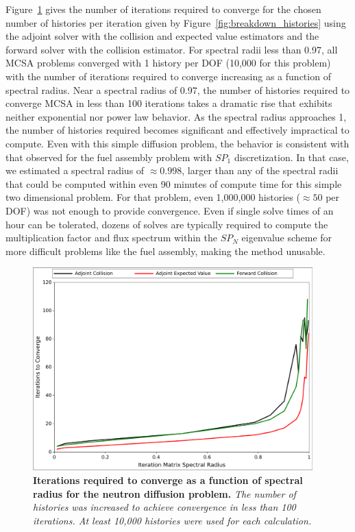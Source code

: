 Figure~\ref{fig:breakdown_iterations} gives the number of iterations
required to converge for the chosen number of histories per iteration
given by Figure~\ref{fig:breakdown_histories} using the adjoint solver
with the collision and expected value estimators and the forward
solver with the collision estimator. For spectral radii less than
0.97, all MCSA problems converged with 1 history per DOF (10,000 for
this problem) with the number of iterations required to converge
increasing as a function of spectral radius. Near a spectral radius of
0.97, the number of histories required to converge MCSA in less than
100 iterations takes a dramatic rise that exhibits neither exponential
nor power law behavior. As the spectral radius approaches 1, the
number of histories required becomes significant and effectively
impractical to compute. Even with this simple diffusion problem, the
behavior is consistent with that observed for the fuel assembly
problem with $SP_1$ discretization. In that case, we estimated a
spectral radius of $\approx 0.998$, larger than any of the spectral
radii that could be computed within even 90 minutes of compute time
for this simple two dimensional problem. For that problem, even
1,000,000 histories ($\approx 50$ per DOF) was not enough to provide
convergence. Even if single solve times of an hour can be tolerated,
dozens of solves are typically required to compute the multiplication
factor and flux spectrum within the $SP_N$ eigenvalue scheme for more
difficult problems like the fuel assembly, making the method unusable.
\begin{figure}[t!]
  \begin{center}
    \includegraphics[width=4.25in]{chapters/spn_equations/breakdown_iterations.pdf}
  \end{center}
  \caption{\textbf{Iterations required to converge as a function of
      spectral radius for the neutron diffusion problem.} \textit{The
      number of histories was increased to achieve convergence in less
      than 100 iterations. At least 10,000 histories were used for
      each calculation.}}
  \label{fig:breakdown_iterations}
\end{figure}
